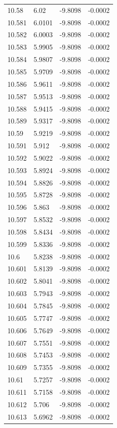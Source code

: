 \begin{tabular}{llll}
10.58 & 6.02 & -9.8098 & -0.0002 \\
10.581 & 6.0101 & -9.8098 & -0.0002 \\
10.582 & 6.0003 & -9.8098 & -0.0002 \\
10.583 & 5.9905 & -9.8098 & -0.0002 \\
10.584 & 5.9807 & -9.8098 & -0.0002 \\
10.585 & 5.9709 & -9.8098 & -0.0002 \\
10.586 & 5.9611 & -9.8098 & -0.0002 \\
10.587 & 5.9513 & -9.8098 & -0.0002 \\
10.588 & 5.9415 & -9.8098 & -0.0002 \\
10.589 & 5.9317 & -9.8098 & -0.0002 \\
10.59 & 5.9219 & -9.8098 & -0.0002 \\
10.591 & 5.912 & -9.8098 & -0.0002 \\
10.592 & 5.9022 & -9.8098 & -0.0002 \\
10.593 & 5.8924 & -9.8098 & -0.0002 \\
10.594 & 5.8826 & -9.8098 & -0.0002 \\
10.595 & 5.8728 & -9.8098 & -0.0002 \\
10.596 & 5.863 & -9.8098 & -0.0002 \\
10.597 & 5.8532 & -9.8098 & -0.0002 \\
10.598 & 5.8434 & -9.8098 & -0.0002 \\
10.599 & 5.8336 & -9.8098 & -0.0002 \\
10.6 & 5.8238 & -9.8098 & -0.0002 \\
10.601 & 5.8139 & -9.8098 & -0.0002 \\
10.602 & 5.8041 & -9.8098 & -0.0002 \\
10.603 & 5.7943 & -9.8098 & -0.0002 \\
10.604 & 5.7845 & -9.8098 & -0.0002 \\
10.605 & 5.7747 & -9.8098 & -0.0002 \\
10.606 & 5.7649 & -9.8098 & -0.0002 \\
10.607 & 5.7551 & -9.8098 & -0.0002 \\
10.608 & 5.7453 & -9.8098 & -0.0002 \\
10.609 & 5.7355 & -9.8098 & -0.0002 \\
10.61 & 5.7257 & -9.8098 & -0.0002 \\
10.611 & 5.7158 & -9.8098 & -0.0002 \\
10.612 & 5.706 & -9.8098 & -0.0002 \\
10.613 & 5.6962 & -9.8098 & -0.0002 \\

\end{tabular}
